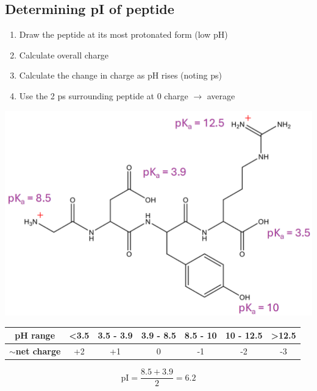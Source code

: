 \documentclass[10pt]{article}
\newcommand{\ka}{\text{$K_\text{a}$}}
\begin{document}
\subsection*{Determining pI of peptide}
\begin{enumerate}
    \item Draw the peptide at its most protonated form (low pH)
    \item Calculate overall charge
    \item Calculate the change in charge as pH rises (noting p\ka s)
    \item Use the 2 p\ka s surrounding peptide at 0 charge $\rightarrow$ average
\end{enumerate}
\begin{center}
    \includegraphics[width=\textwidth]{L2_13.png}
    \begin{tabular}{|c|c|c|c|c|c|c|}
        \hline
        \textbf{pH range} & \textless 3.5 & 3.5 - 3.9 & 3.9 - 8.5 & 8.5 - 10 & 10 - 12.5 & \textgreater 12.5 \\ \hline
        \textbf{$\sim$net charge} & +2 & +1 & 0 & -1 & -2 & -3 \\ \hline
    \end{tabular}
\end{center}
\[\text{pI} = \frac{8.5 + 3.9}{2} \boxed{= 6.2}\]
\end{document}
